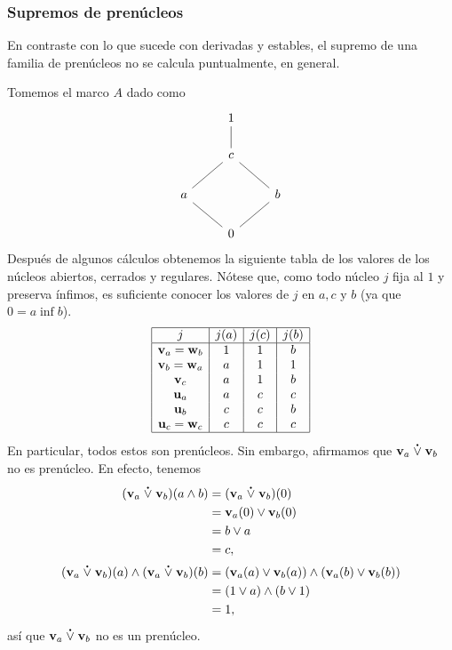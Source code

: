 \subsubsection{Supremos de prenúcleos }

En contraste con lo que sucede con derivadas y estables, el supremo
de una familia de prenúcleos no se calcula puntualmente, en general.

\begin{example}
  Tomemos el marco $A$ dado como
  \[
    \begin{tikzcd}
      & 1 \\
      & c \ar[u,no head] \\
      a \ar[ur,no head] & & b \ar[ul,no head] \\
      & 0 \ar[ur, no head] \ar[ul, no head]
    \end{tikzcd}
  \]
  Después de algunos cálculos obtenemos la siguiente tabla de
  los valores de los núcleos abiertos, cerrados y regulares.
  Nótese que, como todo núcleo $j$ fija al $1$ y preserva ínfimos,
  es suficiente conocer los valores de $j$ en $a,c$ y $b$
  (ya que $0=a\inf b$).
    \[ 
        \begin{array}{|c|c|c|c|}
            \hline
            j & j(a) & j(c) & j(b) \\
            \hline
            \mathbf v_{a} = \mathbf w_{b} & 1 & 1 & b \\
            \mathbf v_{b} = \mathbf w_{a} & a & 1 & 1 \\
            \mathbf v_{c} & a & 1 & b \\
            \mathbf u_{a} & a & c & c \\
            \mathbf u_{b} & c & c & b \\
            \mathbf u_{c} = \mathbf w_{c} & c & c & c \\
            \hline
        \end{array}
    \]
    En particular, todos estos son prenúcleos.
    Sin embargo, afirmamos que $\vnuc a \psup \vnuc b$ no es prenúcleo.
    En efecto, tenemos
    \begin{align*}
        (\vnuc a \psup \vnuc b)(a\inf b)
        &= (\vnuc a \psup \vnuc b)(0) \\
        &= \vnuc a(0) \sup \vnuc b(0) \\
        &= b \sup a \\
        &= c,
        \\
        (\vnuc a \psup \vnuc b)(a)
        \inf (\vnuc a \psup \vnuc b)(b)
        &= (\vnuc a(a)\sup\vnuc b(a))
            \inf
            (\vnuc a(b)\sup\vnuc b(b)) \\
        &= (1\sup a)\inf(b\sup 1) \\
        &= 1,
    \end{align*}
    así que $\vnuc a\psup\vnuc b$ no es un prenúcleo.
\end{example}

